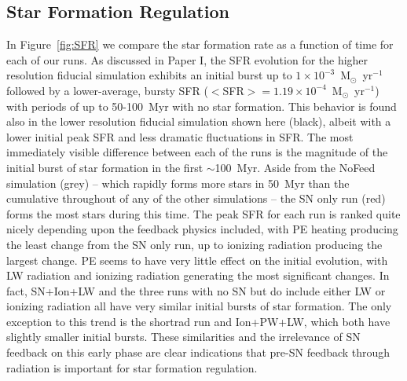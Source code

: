 \documentclass[twocolumn]{aastex62}
\newcommand{\methodpaper}{Paper I}
\newcommand{\fiducialstyle}{black}
\newcommand{\sfrunits}{M$_{\odot}$~yr$^{-1}$}
\begin{document}
\subsection{Star Formation Regulation}
\label{sec:sfr}

In Figure~\ref{fig:SFR} we compare the star formation rate as a function of time for each of our runs. As discussed in \methodpaper, the SFR evolution for the higher resolution fiducial simulation exhibits an initial burst up to $1 \times 10^{-3}$~M$_{\odot}$~yr$^{-1}$ followed by a lower-average, bursty SFR ($<$SFR$> = 1.19\times 10^{-4}$~M$_{\odot}$~yr$^{-1}$) with periods of up to 50-100~Myr with no star formation. This behavior is found also in the lower resolution fiducial simulation shown here (\fiducialstyle), albeit with a lower initial peak SFR and less dramatic fluctuations in SFR.
The most immediately visible difference between each of the runs is the magnitude of the initial burst of star formation in the first $\sim$100~Myr. Aside from the NoFeed simulation (grey) -- which rapidly forms more stars in 50~Myr than the cumulative throughout of any of the other simulations -- the SN only run (red) forms the most stars during this time. The peak SFR for each run is ranked quite nicely depending upon the feedback physics included, with PE heating producing the least change from the SN only run, up to ionizing radiation producing the largest change. PE seems to have very little effect on the initial evolution, with LW radiation and ionizing radiation generating the most significant changes. In fact, SN+Ion+LW and the three runs with no SN but do include either LW or ionizing radiation all have very similar initial bursts of star formation. The only exception to this trend is the shortrad run and Ion+PW+LW, which both have slightly smaller initial bursts. These similarities and the irrelevance of SN feedback on this early phase are clear indications that pre-SN feedback through radiation is important for star formation regulation. %
\end{document}
